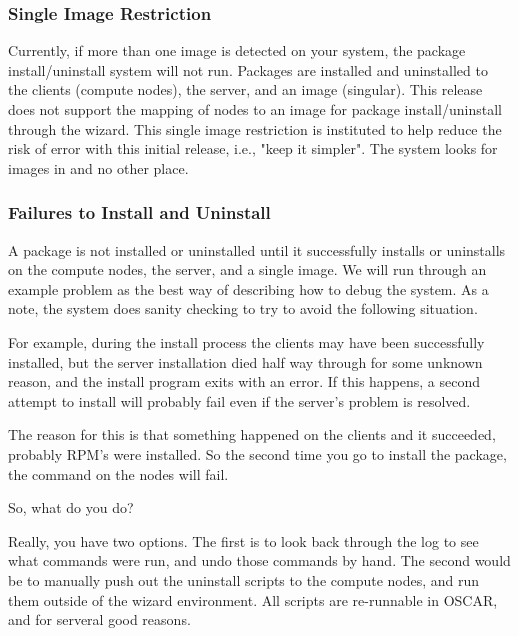 \subsubsection{Single Image Restriction}
\label{det:single-image-restriction}

Currently, if more than one image is detected on your system, the package
install/uninstall system will not run.  Packages are installed and
uninstalled to the clients (compute nodes), the server, and an image
(singular).  This release does not support the mapping of nodes to an
image for package install/uninstall through the wizard.  This single
image restriction is instituted to help reduce the risk of error with this
initial release, i.e., "keep it simpler".  The system looks for images in
 and no other place.


\subsubsection{Failures to Install and Uninstall}
\label{det:failures-install-uninstall}

A package is not installed or uninstalled until it successfully installs or
uninstalls on the compute nodes, the server, and a single image.  We will
run through an example problem as the best way of describing how to debug
the system.  As a note, the system does sanity checking to try to avoid the
following situation.

For example, during the install process the clients may have been successfully
installed, but the server installation died half way through for some unknown
reason, and the install program exits with an error.  If this happens, a
second attempt to install will probably fail even if the server's problem
is resolved.

The reason for this is that something happened on the clients and it
succeeded, probably RPM's were installed.  So the second time you go
to install the package, the  command on the nodes
will fail.

So, what do you do?

Really, you have two options.  The first is to look back through the log to
see what commands were run, and undo those commands by hand.  The second
would be to manually push out the uninstall scripts to the compute nodes,
and run them outside of the wizard environment.  All scripts are re-runnable
in OSCAR, and for serveral good reasons.

